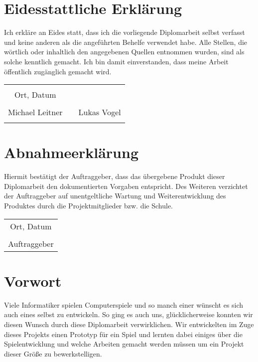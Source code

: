 

\chapter*{Eidesstattliche Erklärung}
Ich erkläre an Eides statt, dass ich die vorliegende Diplomarbeit selbst verfasst und keine anderen als die angeführten Behelfe verwendet habe. Alle Stellen, die wörtlich oder inhaltlich den angegebenen Quellen entnommen wurden, sind als solche kenntlich gemacht.
Ich bin damit einverstanden, dass meine Arbeit öffentlich zugänglich gemacht wird.

\vspace{1cm}
\begin{tabular}{c c c}
	& \hspace{4cm} & \\\cline{1-1}
	Ort, Datum & & \\
	\vspace{2cm}
	& & \\\cline{1-1}\cline{3-3}
	Michael Leitner & & Lukas Vogel \\ 
	\vspace{2cm}

\end{tabular}

\chapter*{Abnahmeerklärung}
Hiermit bestätigt der Auftraggeber, dass das übergebene Produkt dieser Diplomarbeit den dokumentierten Vorgaben entspricht. Des Weiteren verzichtet der Auftraggeber auf unentgeltliche Wartung und Weiterentwicklung des Produktes durch die Projektmitglieder bzw. die Schule.

\vspace{1cm}
\begin{tabular}{c}
	\\\cline{1-1}
	Ort, Datum\\
	\vspace{2cm}
	\\\cline{1-1}
	Auftraggeber
\end{tabular}	

\chapter*{Vorwort}
Viele Informatiker spielen Computerspiele und so manch einer wünscht es sich auch eines selbst zu entwickeln. So ging es auch uns, glücklicherweise konnten wir diesen Wunsch durch diese Diplomarbeit verwirklichen. Wir entwickelten im Zuge dieses Projekts einen Prototyp für ein Spiel und lernten dabei einiges über die Spielentwicklung und welche Arbeiten gemacht werden müssen um ein Projekt dieser Größe zu bewerkstelligen.

